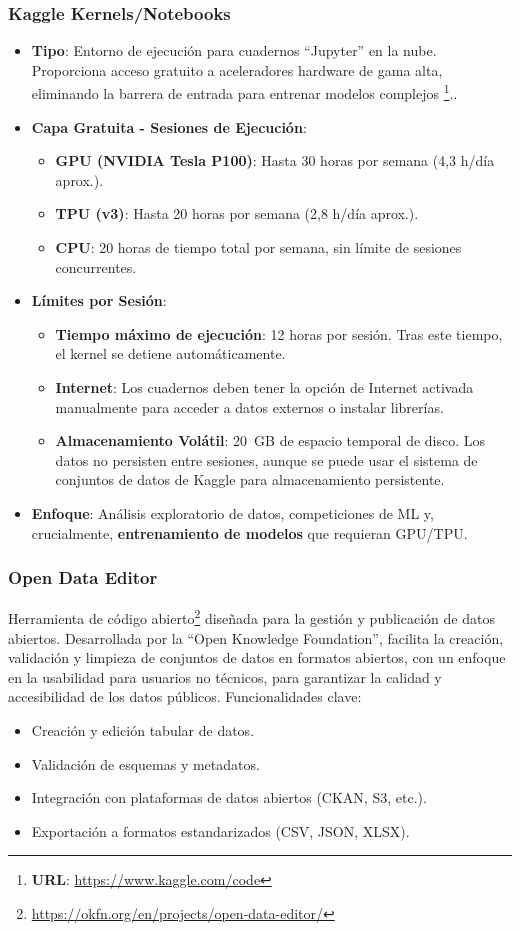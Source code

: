 \subsubsection*{Kaggle Kernels/Notebooks}
\begin{itemize}
	\item \textbf{Tipo}: Entorno de ejecución para cuadernos ``Jupyter'' en la nube. Proporciona acceso gratuito a aceleradores hardware de gama alta, eliminando la barrera de entrada para entrenar modelos complejos  \footnote{\textbf{URL}: \url{https://www.kaggle.com/code}}..
	\item \textbf{Capa Gratuita - Sesiones de Ejecución}:
	\begin{itemize}
		\item \textbf{GPU (NVIDIA Tesla P100)}: Hasta 30 horas por semana (4,3 h/día aprox.).
		\item \textbf{TPU (v3)}: Hasta 20 horas por semana (2,8 h/día aprox.).
		\item \textbf{CPU}: 20 horas de tiempo total por semana, sin límite de sesiones concurrentes.
	\end{itemize}
	\item \textbf{Límites por Sesión}:
	\begin{itemize}
		\item \textbf{Tiempo máximo de ejecución}: 12 horas por sesión. Tras este tiempo, el kernel se detiene automáticamente.
		\item \textbf{Internet}: Los cuadernos deben tener la opción de Internet activada manualmente para acceder a datos externos o instalar librerías.
		\item \textbf{Almacenamiento Volátil}: 20~GB de espacio temporal de disco. Los datos no persisten entre sesiones, aunque se puede usar el sistema de conjuntos de datos de Kaggle para almacenamiento persistente.
	\end{itemize}
	\item \textbf{Enfoque}: Análisis exploratorio de datos, competiciones de ML y, crucialmente, \textbf{entrenamiento de modelos} que requieran GPU/TPU.
\end{itemize}

\subsubsection*{Open Data Editor}
Herramienta de código abierto\footnote{\url{https://okfn.org/en/projects/open-data-editor/}} diseñada para la gestión y publicación de datos abiertos. Desarrollada por la ``Open Knowledge Foundation'', facilita la creación, validación y limpieza de conjuntos de datos en formatos abiertos, con un enfoque en la usabilidad para usuarios no técnicos, para garantizar la calidad y accesibilidad de los datos públicos. Funcionalidades clave:
\begin{itemize}
	\item Creación y edición tabular de datos.
	\item Validación de esquemas y metadatos.
	\item Integración con plataformas de datos abiertos (CKAN, S3, etc.).
	\item Exportación a formatos estandarizados (CSV, JSON, XLSX).
\end{itemize}

